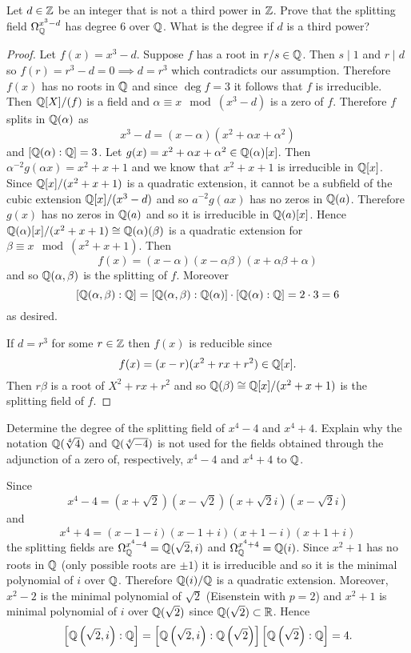     \begin{ex}{21.36}
        Let $d\in\mathbb{Z}$ be an integer that is not a third power in $\mathbb{Z}$. Prove that the splitting field $\Omega_{\mathbb{Q}}^{x^3-d}$ has degree 6 over $\mathbb{Q}$.
        What is the degree if $d$ is a third power?
    \end{ex}
    \begin{proof}
        Let $f(x)=x^3-d$. Suppose $f$ has a root in $r/s\in\mathbb{Q}$. Then $s\mid 1$ and $r\mid d$ so $f(r)=r^3-d=0\implies d=r^3$ which contradicts our assumption.
        Therefore $f(x)$ has no roots in $\mathbb{Q}$ and since $\deg f=3$ it follows that $f$ is irreducible. Then $\mathbb{Q}[X]/(f)$ is a field and $\alpha\equiv x\mod\left(x^3-d\right)$ is a zero of $f$.
        Therefore $f$ splits in $\mathbb{Q}(\alpha)$ as
        $$x^3-d=(x-\alpha)(x^2+\alpha x+\alpha^2)$$
        and $[\mathbb{Q}(\alpha):\mathbb{Q}]=3$. Let $g(x)=x^2+\alpha x+\alpha^2\in\mathbb{Q}(\alpha)[x]$. Then $\alpha^{-2}g(\alpha x)=x^2+x+1$ and we know that  $x^2+x+1$ is irreducible in $\mathbb{Q}[x]$. 
        Since $\mathbb{Q}[x]/(x^2+x+1)$ is a quadratic extension, it cannot be a subfield of the cubic extension $\mathbb{Q}[x]/(x^3-d)$ and so $a^{-2}g(ax)$ has no zeros in $\mathbb{Q}(a)$.
        Therefore $g(x)$ has no zeros in $\mathbb{Q}(a)$ and so it is irreducible in $\mathbb{Q}(a)[x]$. Hence $\mathbb{Q}(\alpha)[x]/(x^2+x+1)\cong\mathbb{Q}(\alpha)(\beta)$ is a quadratic extension for $\beta\equiv x\mod\left(x^2+x+1\right)$.
        Then 
        $$f(x)=(x-\alpha)(x-\alpha\beta)(x+\alpha\beta+\alpha)$$
        and so $\mathbb{Q}(\alpha, \beta)$ is the splitting of $f$.
        Moreover
        $$[\mathbb{Q}(\alpha, \beta):\mathbb{Q}]=[\mathbb{Q}(\alpha,\beta):\mathbb{Q}(\alpha)]\cdot[\mathbb{Q}(\alpha):\mathbb{Q}]=2\cdot 3= 6$$
        as desired.

        If $d=r^3$ for some $r\in\mathbb{Z}$ then $f(x)$ is reducible since
        $$f(x)=(x-r)(x^2+rx+r^2)\in\mathbb{Q}[x].$$
        Then $r\beta$ is a root of $X^2+rx+r^2$ and so $\mathbb{Q}(\beta)\cong\mathbb{Q}[x]/(x^2+x+1)$ is the splitting field of $f$.
    \end{proof}

    \begin{ex}{21.38}
        Determine the degree of the splitting field of $x^4-4$ and $x^4+4$. Explain why the notation $\mathbb{Q}(\sqrt[4]{4})$ and $\mathbb{Q}(\sqrt[4]{-4})$  is not used for the fields obtained through the adjunction of a zero of, respectively, $x^4-4$ and $x^4+4$ to $\mathbb{Q}$.
    \end{ex}
    \begin{sol}
        Since
        $$ x^4-4=\left(x+\sqrt{2}\right)\left(x-\sqrt{2}\right)\left(x+\sqrt{2}i\right)\left(x-\sqrt{2}i\right)$$
        and
        $$x^4+4=\left(x-1-i\right)\left(x-1+i\right)\left(x+1-i\right)\left(x+1+i\right)$$
        the splitting fields are $\Omega_{\mathbb{Q}}^{x^4-4}=\mathbb{Q}(\sqrt{2}, i)$ and $\Omega_{\mathbb{Q}}^{x^4+4}=\mathbb{Q}(i)$.
        Since $x^2+1$ has no roots in $\mathbb{Q}$ (only possible roots are $\pm 1$) it is irreducible and so it is the minimal polynomial of $i$ over $\mathbb{Q}$.
        Therefore $\mathbb{Q}(i)/\mathbb{Q}$ is a quadratic extension. 
        Moreover, $x^2-2$ is the minimal polynomial of $\sqrt{2}$ (Eisenstein with $p=2$) and $x^2+1$ is minimal polynomial of $i$ over $\mathbb{Q}(\sqrt{2})$ since $\mathbb{Q}(\sqrt{2})\subset\mathbb{R}$.
        Hence
        $$\left[\mathbb{Q}\left(\sqrt{2}, i\right):\mathbb{Q}\right]=\left[\mathbb{Q}\left(\sqrt{2}, i\right):\mathbb{Q}\left(\sqrt{2}\right)\right]\left[\mathbb{Q}\left(\sqrt{2}\right):\mathbb{Q}\right]=4.$$   
    \end{sol}